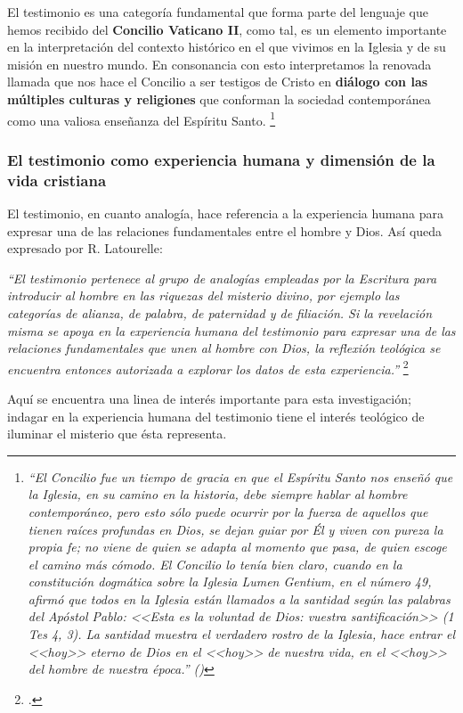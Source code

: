 \documentclass[11pt]{article}
\begin{document}
El testimonio es una categoría fundamental que forma parte del lenguaje que hemos recibido del \textbf{Concilio Vaticano II}, como tal, es un elemento importante en la interpretación del contexto histórico en el que vivimos en la Iglesia y de su misión en nuestro mundo. En consonancia con esto interpretamos la renovada llamada que nos hace el Concilio a ser testigos de Cristo en \textbf{diálogo con las múltiples culturas y religiones} que conforman la sociedad contemporánea como una valiosa enseñanza del Espíritu Santo.
\footnote{ 
\emph{
``El Concilio fue un tiempo de gracia en que el Espíritu Santo nos enseñó que la Iglesia, en su camino en la historia, debe siempre hablar al hombre contemporáneo, pero esto sólo puede ocurrir por la fuerza de aquellos que tienen raíces profundas en Dios, se dejan guiar por Él y viven con pureza la propia fe; no viene de quien se adapta al momento que pasa, de quien escoge el camino más cómodo. El Concilio lo tenía bien claro, cuando en la constitución dogmática sobre la Iglesia Lumen Gentium, en el número 49, afirmó que todos en la Iglesia están llamados a la santidad según las palabras del Apóstol Pablo: <<Esta es la voluntad de Dios: vuestra santificación>> (1 Tes 4, 3). La santidad muestra el verdadero rostro de la Iglesia, hace entrar el <<hoy>> eterno de Dios en el <<hoy>> de nuestra vida, en el <<hoy>> del hombre de nuestra época.'' (\cite{benxvi})
}
}

\subsubsection{El testimonio como experiencia humana y dimensión de la vida cristiana}

El testimonio, en cuanto analogía, hace referencia a la experiencia humana para expresar una de las relaciones fundamentales entre el hombre y Dios. Así queda expresado por R. Latourelle:

\emph{
``El testimonio pertenece al grupo de analogías empleadas por la Escritura para introducir al hombre en las riquezas del misterio divino, por ejemplo las categorías de alianza, de palabra, de paternidad y de filiación. Si la revelación misma se apoya en la experiencia humana del testimonio para expresar una de las relaciones fundamentales que unen al hombre con Dios, la reflexión teológica se encuentra entonces autorizada a explorar los datos de esta experiencia.''
}\footcite[1523]{dicctf}

Aquí se encuentra una linea de interés importante para esta investigación; indagar en la experiencia humana del testimonio tiene el interés teológico de iluminar el misterio que ésta representa. 
\end{document}
